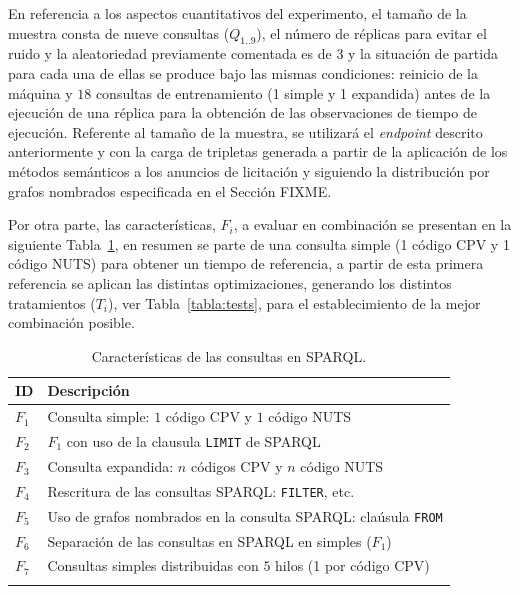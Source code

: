 \begin{enumerate}
En referencia a los aspectos cuantitativos del experimento, el tamaño de la muestra consta de nueve consultas ($Q_{1..9}$), el número de réplicas 
para evitar el ruido y la aleatoriedad previamente comentada es de $3$ y la situación de partida para cada una de ellas se produce 
bajo las mismas condiciones: reinicio de la máquina y $18$ consultas de entrenamiento (1 simple y 1 expandida) antes de la ejecución de una réplica para la obtención 
de las observaciones de tiempo de ejecución. Referente al tamaño de la muestra, se utilizará el \textit{endpoint} descrito anteriormente y con la carga 
de tripletas generada a partir de la aplicación de los métodos semánticos a los anuncios de licitación y siguiendo la distribución por 
grafos nombrados especificada en el Sección FIXME.

Por otra parte, las características, $F_i$, a evaluar en combinación se presentan en la siguiente Tabla~\ref{table:sparql-features}, en resumen se parte de una 
consulta simple (1 código CPV y 1 código NUTS) para obtener un tiempo de referencia, a partir de esta primera referencia se aplican 
las distintas optimizaciones, generando los distintos tratamientos ($T_i$), ver Tabla~\ref{tabla:tests}, para el establecimiento de la mejor combinación posible.

\begin{longtable}[c]{|l|p{10cm}|} 
\hline
\textbf{ID} &  \textbf{Descripción}  \\\hline
\endhead
$F_1$ & Consulta simple: $1$ código CPV y $1$ código NUTS \\ \hline
$F_2$ & $F_1$ con uso de la clausula \texttt{LIMIT} de SPARQL \\ \hline
$F_3$ & Consulta expandida: $n$ códigos CPV y $n$ código NUTS  \\ \hline
$F_4$ & Rescritura de las consultas SPARQL: \texttt{FILTER}, etc.  \\ \hline
$F_5$ & Uso de grafos nombrados en la consulta SPARQL: claúsula \texttt{FROM} \\ \hline
$F_6$ & Separación de las consultas en SPARQL en simples ($F_1$) \\ \hline
$F_7$ & Consultas simples distribuidas con $5$ hilos (1 por código CPV) \\ \hline
\hline
\caption{Características de las consultas en SPARQL.}\label{table:sparql-features}\\    
\end{longtable}

\newpage 


\end{enumerate}
